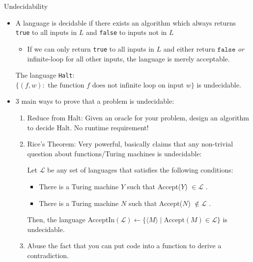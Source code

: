 \documentclass{beamer}
\begin{document}
\begin{frame}[t]{Undecidability}
    \begin{itemize}
        \item A language is \alert{decidable} if there exists an algorithm which always returns \texttt{true} to all inputs in $L$ and \texttt{false} to inputs not in $L$
        \begin{itemize}
            \item If we can only return \texttt{true} to all inputs in $L$ and either return $\texttt{false}$ \textit{or} infinite-loop for all other inputs, the language is merely \alert{acceptable}.
        \end{itemize}
        \begin{theorem}[Turing, 1936]
            The language \texttt{Halt}: $\{(f, w): \text{ the function } f \text{ does not infinite loop on input } w\}$ is undecidable.
        \end{theorem}
        \item 3 main ways to prove that a problem is undecidable:
        \begin{enumerate}
            \item \pause Reduce from Halt: Given an oracle for your problem, design an algorithm to decide Halt. No runtime requirement!
            \item \pause Rice's Theorem: Very powerful, basically claims that any non-trivial question about functions/Turing machines is undecidable:
            \begin{theorem}[Rice]
                Let $\mathcal{L}$ be any set of languages that satisfies the following conditions: 
                \begin{itemize}
                    \item There is a Turing machine $Y$ such that Accept($Y$) $\in \mathcal{L}$ .
                    \item There is a Turing machine $N$ such that Accept($N$) $\not\in \mathcal{L}$ .
                \end{itemize}
            Then, the language AcceptIn$(\mathcal{L}) \gets \{\langle M \rangle \mid \text{Accept}(M) \in \mathcal{L}\}$ is undecidable.
            \end{theorem}
            \item \pause Abuse the fact that you can put code into a function to derive a contradiction.
        \end{enumerate}
    \end{itemize}
\end{frame}
\end{document}
